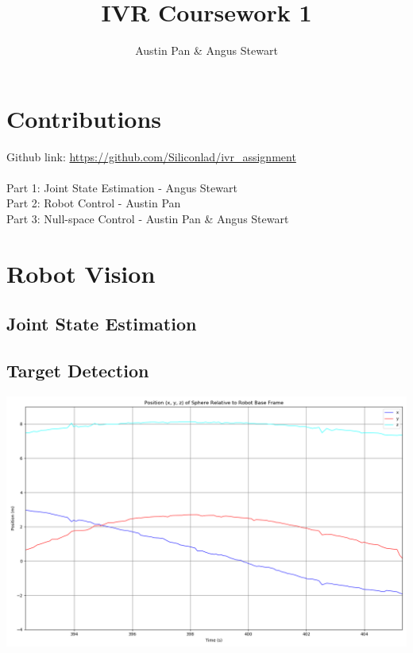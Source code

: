 \documentclass[11pt]{article}
\begin{document}
\title{IVR Coursework 1}
\author{Austin Pan \& Angus Stewart}
\maketitle

\section{Contributions}
Github link: \href{https://github.com/Siliconlad/ivr\_assignment}{https://github.com/Siliconlad/ivr\_assignment} \\ \\
Part 1: Joint State Estimation - Angus Stewart \\
Part 2: Robot Control - Austin Pan \\
Part 3: Null-space Control - Austin Pan \& Angus Stewart

\section{Robot Vision}

\subsection{Joint State Estimation}

\subsection{Target Detection}

\begin{center}
	\includegraphics[scale=0.4]{target-sphere}
\end{center}
\end{document}
